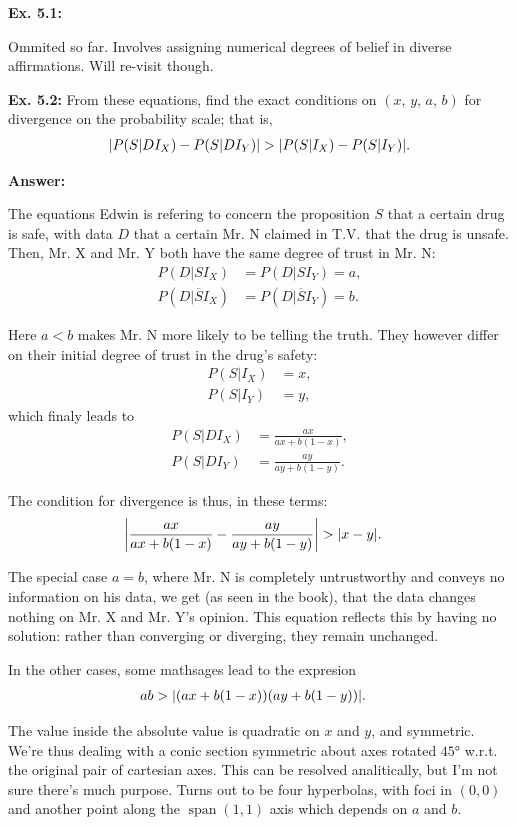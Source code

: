 \documentclass{article}
\newcommand\oname{\operatorname}
\begin{document}
\textbf{Ex. 5.1: }

Ommited so far. Involves assigning numerical degrees of belief in diverse affirmations. Will re-visit though.

\textbf{Ex. 5.2: }From these equations, find the exact conditions on $(x,\,y,\,a,\,b)$ for divergence on the probability scale; that is,
\begin{align*}
	\abs{P(S|DI_X)-P(S|DI_Y)}>\abs{P(S|I_X)-P(S|I_Y)}.
\end{align*}

\textbf{Answer:}

The equations Edwin is refering to concern the proposition $S$ that a certain drug is safe, with data $D$ that a certain Mr. N claimed in T.V. that the drug is unsafe. Then, Mr. X and Mr. Y both have the same degree of trust in Mr. N:
\begin{align*}
	P(D|SI_X)&=P(D|SI_Y)=a,\\
	P(D|\overline{S}I_X)&=P(D|\overline{S}I_Y)=b.
\end{align*}

Here $a<b$ makes Mr. N more likely to be telling the truth. They however differ on their initial degree of trust in the drug's safety:
\begin{align*}
	P(S|I_X)&=x,\\
	P(S|I_Y)&=y,
\end{align*}
which finaly leads to
\begin{align*}
	P(S|DI_X)&=\frac{ax}{ax+b(1-x)},\\
	P(S|DI_Y)&=\frac{ay}{ay+b(1-y)}.
\end{align*}

The condition for divergence is thus, in these terms:
\begin{align*}
	\abs{\frac{ax}{ax+b(1-x)}-\frac{ay}{ay+b(1-y)}}&>\abs{x-y}.
\end{align*}

The special case $a=b$, where Mr. N is completely untrustworthy and conveys no information on his data, we get (as seen in the book), that the data changes nothing on Mr. X and Mr. Y's opinion. This equation reflects this by having no solution: rather than converging or diverging, they remain unchanged.

In the other cases, some mathsages lead to the expresion
\begin{align*}
	ab&>\abs{(ax+b(1-x))(ay+b(1-y))}.
\end{align*}

The value inside the absolute value is quadratic on $x$ and $y$, and symmetric. We're thus dealing with a conic section symmetric about axes rotated $45°$ w.r.t. the original pair of cartesian axes. This can be resolved analitically, but I'm not sure there's much purpose. Turns out to be four hyperbolas, with foci in $(0, 0)$ and another point along the $\oname{span}(1, 1)$ axis which depends on $a$ and $b$.
\end{document}
